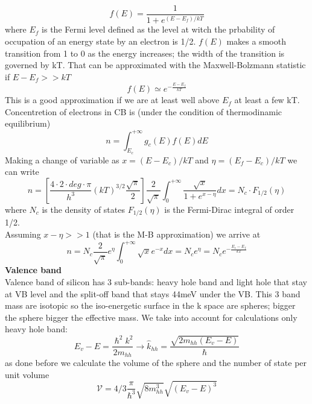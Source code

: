 \begin{equation}
f(E)=\frac{1}{1+e^{(E-E_f)/kT}}
\end{equation}
where $E_f$ is the Fermi level defined as the level at witch the prbability of occupation of an energy state by an electron is 1/2. $f(E)$ makes a smooth transition from 1 to 0 as the energy increases; the width of the transition is governed by kT.
That can be approximated with the Maxwell-Bolzmann statistic if $E-E_f>>kT$ 
\begin{equation}
f(E)\simeq e^{-\frac{E-E_f}{kT}}
\end{equation}
This is a good approximation if we are at least well above $E_f$ at least a few kT.\\
Concentretion of electrons in CB is (under the condition of thermodinamic equilibrium)
\begin{equation}
n=\int^{+\infty}_{E_c} g_c(E)f(E)dE
\end{equation}
Making a change of variable as $x=(E-E_c)/kT$ and $\eta=(E_f-E_c)/kT$ we can write
\begin{equation}
n=\left[\frac{4\cdot 2\cdot deg \cdot \pi}{h^3}(kT)^{3/2}\frac{\sqrt{\pi}}{2}\right]\frac{2}{\sqrt{\pi}}\int^{+\infty}_0 \frac{\sqrt{x}}{1+e^{x-\eta}}dx=N_c\cdot F_{1/2}(\eta)
\end{equation}  
where $N_c$ is the density of states $F_{1/2}(\eta)$ is the Fermi-Dirac integral of order 1/2.\\
Assuming $x-\eta>>1$ (that is the M-B approximation) we arrive at 
\begin{equation}
n=N_c\frac{2}{\sqrt{\pi}}e^\eta \int^{+\infty}_0\sqrt{x}e^{-x}dx=N_ce^\eta=N_c e^{-\frac{E_c-E_f}{kT}}
\end{equation}
\newline
{\bf Valence band}\\
Valence band of silicon has 3 sub-bands: heavy hole band and light hole that stay at VB level and the split-off band that stays 44meV under the VB. This 3 band mass are isotopic so the iso-energetic surface in the k space are spheres; bigger the sphere bigger the effective mass. We take into account for calculations only heavy hole band: 
\begin{equation}
E_v-E=\frac{\hslash^2 k^2}{2m_{hh}}\rightarrow\hat{k}_{hh}=\frac{\sqrt{2m_{hh}(E_v-E)}}{\hslash}
\end{equation} 
as done before we calculate the volume of the sphere and the number of state per unit volume
\begin{equation}
\mathcal{V}=4/3\frac{\pi}{\hslash^3}\sqrt{8m_{hh}^3}\sqrt{(E_v-E)^3} 
\end{equation}
